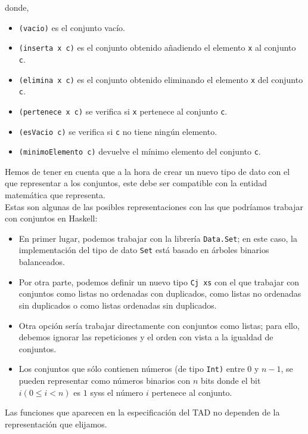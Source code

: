 donde,

\begin{itemize}
\item \texttt{(vacio)} es el conjunto vacío.
\item \texttt{(inserta x c)} es el conjunto obtenido añadiendo el      
      elemento \texttt{x} al conjunto \texttt{c}.
\item \texttt{(elimina x c)} es el conjunto obtenido eliminando el
      elemento \texttt{x} del conjunto \texttt{c}.
\item \texttt{(pertenece x c)} se verifica si \texttt{x} pertenece al
      conjunto \texttt{c}.
\item \texttt{(esVacio c)} se verifica si \texttt{c} no tiene ningún
      elemento.
\item \texttt{(minimoElemento c)} devuelve el mínimo elemento del      
      conjunto \texttt{c}.\\
\end{itemize}


Hemos de tener en cuenta que a la hora de crear un nuevo tipo de dato 
con el que representar a los conjuntos, este debe ser compatible con 
la entidad matemática que representa.\\

Estas son algunas de las posibles representaciones con las que podríamos
trabajar con conjuntos en Haskell:

\begin{itemize}
\item En primer lugar, podemos trabajar con la librería \texttt{Data.Set}; en
  este caso, la implementación del tipo de dato \texttt{Set} está basado en
  árboles binarios balanceados.
\item Por otra parte, podemos definir un nuevo tipo \texttt{Cj xs} con el que
  trabajar con conjuntos como listas no ordenadas con duplicados, como listas
  no ordenadas sin duplicados o como listas ordenadas sin duplicados.
\item Otra opción sería trabajar directamente con conjuntos como listas; para
  ello, debemos ignorar las repeticiones y el orden con vista a la igualdad de
  conjuntos. 
\item Los conjuntos que sólo contienen números (de tipo \texttt{Int)} entre
  $0$ y $n-1$, se pueden representar como números binarios con $n$ bits donde
  el bit $i (0 ≤ i < n)$ es $1$ syss el número $i$ pertenece al conjunto.
\end{itemize}

\begin{nota}
  Las funciones que aparecen en la especificación del TAD no dependen 
  de la representación que elijamos.
\end{nota}

